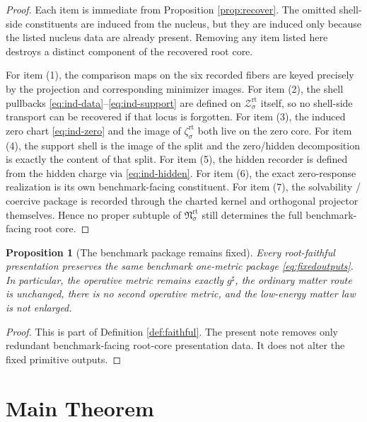 \documentclass[11pt]{article}
\newcommand{\CompletedMetric}{g^{\sharp}}
\newcommand{\RootShellSet}[1]{\mathcal Z_{#1}^{\mathrm{rt}}}
\newcommand{\RootEmbed}[1]{\zeta_{#1}^{\mathrm{rt}}}
\newcommand{\RootNucleus}[1]{\mathfrak N_{#1}^{\mathrm{rt}}}
\newtheorem{proposition}{Proposition}
\begin{document}
\begin{proof}
Each item is immediate from Proposition \ref{prop:recover}. The omitted shell-side constituents are induced from the nucleus, but they are induced only because the listed nucleus data are already present. Removing any item listed here destroys a distinct component of the recovered root core.

For item (1), the comparison maps on the six recorded fibers are keyed precisely by the projection and corresponding minimizer images. For item (2), the shell pullbacks \eqref{eq:ind-data}--\eqref{eq:ind-support} are defined on \(\RootShellSet{\sigma}\) itself, so no shell-side transport can be recovered if that locus is forgotten. For item (3), the induced zero chart \eqref{eq:ind-zero} and the image of \(\RootEmbed{\sigma}\) both live on the zero core. For item (4), the support shell is the image of the split and the zero/hidden decomposition is exactly the content of that split. For item (5), the hidden recorder is defined from the hidden charge via \eqref{eq:ind-hidden}. For item (6), the exact zero-response realization is its own benchmark-facing constituent. For item (7), the solvability / coercive package is recorded through the charted kernel and orthogonal projector themselves. Hence no proper subtuple of \(\RootNucleus{\sigma}\) still determines the full benchmark-facing root core.
\end{proof}

\begin{proposition}[The benchmark package remains fixed]
\label{prop:benchmark}
Every root-faithful presentation preserves the same benchmark one-metric package \eqref{eq:fixedoutputs}. In particular, the operative metric remains exactly \(\CompletedMetric\), the ordinary matter route is unchanged, there is no second operative metric, and the low-energy matter law is not enlarged.
\end{proposition}

\begin{proof}
This is part of Definition \ref{def:faithful}. The present note removes only redundant benchmark-facing root-core presentation data. It does not alter the fixed primitive outputs.
\end{proof}

\section{Main Theorem}
\end{document}
